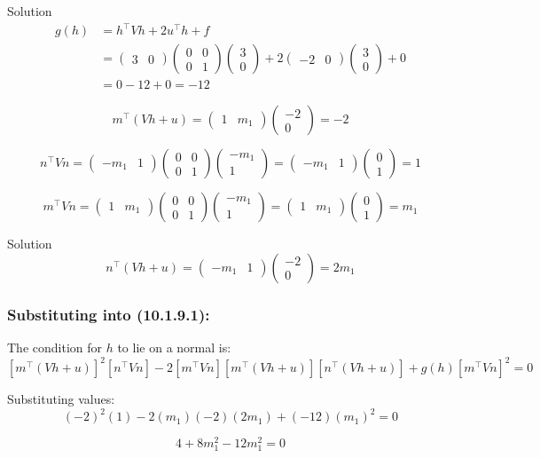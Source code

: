 \documentclass{beamer}
\newcommand{\myvec}[1]{\ensuremath{\begin{pmatrix}#1\end{pmatrix}}}
\begin{document}
\begin{frame}{Solution}
\begin{equation}
	\begin{aligned}
		g(h) &= h^\top Vh + 2u^\top h + f \\
		&= \myvec{3 & 0}\myvec{0 & 0\\0 & 1}\myvec{3\\0} + 2\myvec{-2 & 0}\myvec{3\\0} + 0\\
		&= 0 - 12 + 0 = -12
	\end{aligned}
\end{equation}

\begin{equation}
	m^\top(Vh + u) = \myvec{1 & m_1}\myvec{-2\\0} = -2
\end{equation}

\begin{equation}
	n^\top Vn = \myvec{-m_1 & 1}\myvec{0 & 0\\0 & 1}\myvec{-m_1\\1} = \myvec{-m_1 & 1}\myvec{0\\1} = 1
\end{equation}

\begin{equation}
	m^\top Vn = \myvec{1 & m_1}\myvec{0 & 0\\0 & 1}\myvec{-m_1\\1} = \myvec{1 & m_1}\myvec{0\\1} = m_1
\end{equation}
\end{frame}

\begin{frame}{Solution}
\begin{equation}
	n^\top(Vh + u) = \myvec{-m_1 & 1}\myvec{-2\\0} = 2m_1
\end{equation}

\subsubsection*{Substituting into (10.1.9.1):}

The condition for $h$ to lie on a normal is:
\begin{equation}
	\left[m^\top(Vh + u)\right]^2\left[n^\top Vn\right] - 2\left[m^\top Vn\right]\left[m^\top(Vh + u)\right]\left[n^\top(Vh + u)\right] + g(h)\left[m^\top Vn\right]^2 = 0
\end{equation}

Substituting values:
\begin{equation}
	(-2)^2(1) - 2(m_1)(-2)(2m_1) + (-12)(m_1)^2 = 0
\end{equation}

\begin{equation}
	4 + 8m_1^2 - 12m_1^2 = 0
\end{equation}
\end{frame}
\end{document}
